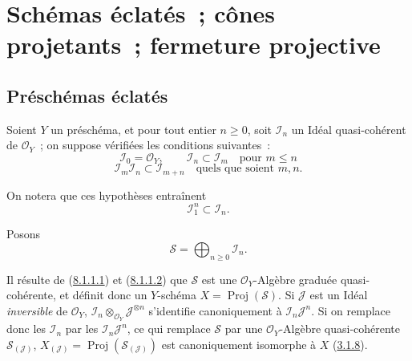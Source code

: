 \section{Schémas éclatés~; cônes projetants~; fermeture projective}
\label{section:II.8-fr}

\subsection{Préschémas éclatés}
\label{subsection:II.8.1-fr}

\begin{env}[8.1.1]
\label{II.8.1.1-fr}
Soient $Y$ un préschéma, et pour tout entier $n\geq0$, soit $\mathcal{I}_n$ un
Idéal quasi-cohérent de $\mathcal{O}_Y$~; on suppose vérifiées les conditions
suivantes~:
\begin{equation}
\label{II.8.1.1.1-fr}
  \mathcal{I}_0=\mathcal{O}_Y,\qquad
  \mathcal{I}_n\subset\mathcal{I}_m\quad\text{pour }m\leq n
\tag{8.1.1.1}
\end{equation}
\begin{equation}
\label{II.8.1.1.2-fr}
  \mathcal{I}_m\mathcal{I}_n\subset\mathcal{I}_{m+n}
  \quad\text{quels que soient }m,n.
\tag{8.1.1.2}
\end{equation}

On notera que ces hypothèses entraînent
\begin{equation}
\label{II.8.1.1.3-fr}
  \mathcal{I}_1^n\subset\mathcal{I}_n.
\tag{8.1.1.3}
\end{equation}

Posons
\begin{equation}
\label{II.8.1.1.4-fr}
  \mathcal{S}=\bigoplus_{n\geq0}\mathcal{I}_n.
\tag{8.1.1.4}
\end{equation}

Il résulte de (\hyperref[II.8.1.1.1-fr]{8.1.1.1}) et
(\hyperref[II.8.1.1.2-fr]{8.1.1.2}) que $\mathcal{S}$ est une
$\mathcal{O}_Y$-Algèbre graduée quasi-cohérente, et définit donc un $Y$-schéma
$X=\operatorname{Proj}(\mathcal{S})$. Si $\mathcal{J}$ est un Idéal
\emph{inversible} de $\mathcal{O}_Y$,
$\mathcal{I}_n\otimes_{\mathcal{O}_Y}\mathcal{J}^{\otimes n}$ s'identifie
canoniquement à $\mathcal{I}_n\mathcal{J}^n$. Si on remplace donc les
$\mathcal{I}_n$ par les $\mathcal{I}_n\mathcal{J}^n$, ce qui remplace
$\mathcal{S}$ par une $\mathcal{O}_Y$-Algèbre quasi-cohérente
$\mathcal{S}_{(\mathcal{J})}$,
$X_{(\mathcal{J})}=\operatorname{Proj}(\mathcal{S}_{(\mathcal{J})})$ est
canoniquement isomorphe à $X$ (\hyperref[II.3.1.8-fr]{3.1.8}).
\end{env}

